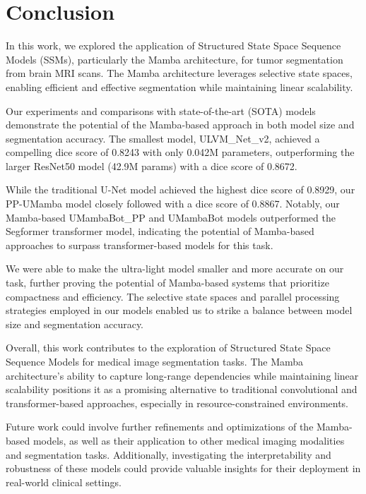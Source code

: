 \documentclass[conference]{IEEEtran}
\begin{document}
\section{Conclusion}

In this work, we explored the application of Structured State Space Sequence Models (SSMs), particularly the Mamba architecture, for tumor segmentation from brain MRI scans. The Mamba architecture leverages selective state spaces, enabling efficient and effective segmentation while maintaining linear scalability.

Our experiments and comparisons with state-of-the-art (SOTA) models demonstrate the potential of the Mamba-based approach in both model size and segmentation accuracy. The smallest model, ULVM\_Net\_v2, achieved a compelling dice score of 0.8243 with only 0.042M parameters, outperforming the larger ResNet50 model (42.9M params) with a dice score of 0.8672.

While the traditional U-Net model achieved the highest dice score of 0.8929, our PP-UMamba model closely followed with a dice score of 0.8867. Notably, our Mamba-based UMambaBot\_PP and UMambaBot models outperformed the Segformer transformer model, indicating the potential of Mamba-based approaches to surpass transformer-based models for this task.

We were able to make the ultra-light model smaller and more accurate on our task, further proving the potential of Mamba-based systems that prioritize compactness and efficiency. The selective state spaces and parallel processing strategies employed in our models enabled us to strike a balance between model size and segmentation accuracy.

Overall, this work contributes to the exploration of Structured State Space Sequence Models for medical image segmentation tasks. The Mamba architecture's ability to capture long-range dependencies while maintaining linear scalability positions it as a promising alternative to traditional convolutional and transformer-based approaches, especially in resource-constrained environments.

Future work could involve further refinements and optimizations of the Mamba-based models, as well as their application to other medical imaging modalities and segmentation tasks. Additionally, investigating the interpretability and robustness of these models could provide valuable insights for their deployment in real-world clinical settings.
\end{document}
